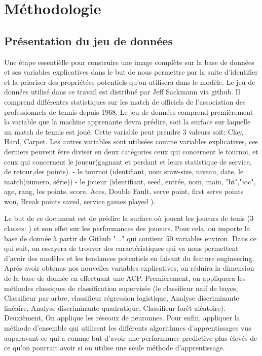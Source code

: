 \section{Méthodologie}

\subsection{Présentation du jeu de données}
Une étape essentièlle pour construire une image complète sur la base de données et ses variables explicatives dans le but de nous permettre par la suite d'identifier et la prioriser des propriétées potentiels qu'on utilisera dans le modèle. 
Le jeu de données utilisé dans ce travail est distribué par Jeff Sackmann via github. Il comprend différentes statistiques sur les match de officiels de l'association des professionnels de tennis depuis 1968. Le jeu de données comprend premièrement la variable que la machine apprenante devra prédire, soit la surface sur laquelle un match de tennis est joué. Cette variable peut prendre 3 valeurs soit: Clay, Hard, Carpet. Les autres variables sont utilisées comme variables explicatives, ces derniers peuvent être diviser en deux catégories ceux qui concernent le tournoi, et ceux qui concernent le joueur(gagnant et perdant et leurs statistique de service, de retour,des points).
- le tournoi (identifiant, nom sraw-size, niveau, date, le match(numero, série))
- le joueur (identifiant, seed, entrée, nom, main, "ht","ioc", age, rang, les points, score, Aces, Double Fault, serve point, first serve points won, Break points saved, service games played ).







Le but de ce document est de prédire la surface où jouent les joueurs de tenis (3 classes: ) et son effet sur les performances des joueurs. Pour cela, on importe la base de donnée à partir de Github "..." qui contient 50 variables environ. Dans ce qui suit, on essayera de trouver des caractéristiques qui va nous permettent d'avoir des modèles et les tendances potentiels en faisant du feature engineering. Aprés avoir obtenus nos nouvelles variables explicatives, on réduira la dimension de la base de donnée en effectuant une ACP. Premièrement, on appliquera les méthodes classiques de classification supervisée (le classifieur naif de bayes, Classifieur par arbre, classifieur régression logistique, Analyse discriminante linéaire, Analyse discriminante quadratique, Classifieur forêt aléatoire). Deuxièment, On applique les réseaux de neuronnes. Pour enfin, appliquer la méthode d'ensemble qui  utilisent les différents algorithmes d'apprentissages vus auparavant ce qui a comme but d'avoir une performance predictive plus élevés de ce qu'on pourrait avoir si on utilise une seule méthode d'apprentissage.


